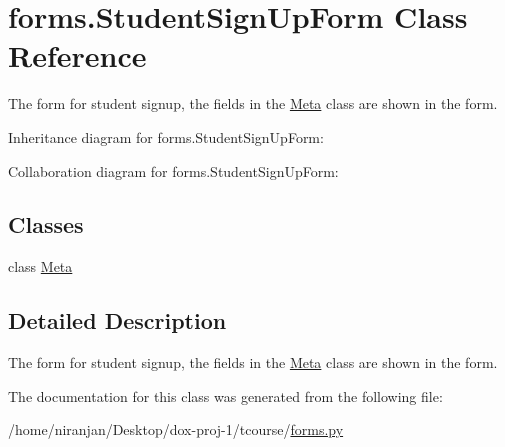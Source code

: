 \hypertarget{classforms_1_1_student_sign_up_form}{}\section{forms.\+Student\+Sign\+Up\+Form Class Reference}
\label{classforms_1_1_student_sign_up_form}


The form for student signup, the fields in the \hyperlink{classforms_1_1_student_sign_up_form_1_1_meta}{Meta} class are shown in the form.  




Inheritance diagram for forms.\+Student\+Sign\+Up\+Form\+:


Collaboration diagram for forms.\+Student\+Sign\+Up\+Form\+:
\subsection*{Classes}
\begin{DoxyCompactItemize}
\item 
class \hyperlink{classforms_1_1_student_sign_up_form_1_1_meta}{Meta}
\end{DoxyCompactItemize}


\subsection{Detailed Description}
The form for student signup, the fields in the \hyperlink{classforms_1_1_student_sign_up_form_1_1_meta}{Meta} class are shown in the form. 

The documentation for this class was generated from the following file\+:\begin{DoxyCompactItemize}
\item 
/home/niranjan/\+Desktop/dox-\/proj-\/1/tcourse/\hyperlink{forms_8py}{forms.\+py}\end{DoxyCompactItemize}
